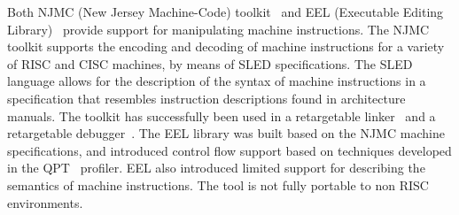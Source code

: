 Both NJMC (New Jersey Machine-Code) toolkit~\cite{Rams95,Rams97} and EEL
(Executable Editing Library)~\cite{Laru95} provide support for
manipulating machine instructions.  The NJMC toolkit supports the 
encoding and decoding of machine instructions for a variety of 
RISC and CISC machines, by means of SLED specifications.  
The SLED language allows for the description of the syntax of machine 
instructions in a specification that resembles instruction descriptions 
found in architecture manuals.
The toolkit has successfully been used in a retargetable 
linker~\cite{Fern95} and a retargetable debugger~\cite{Rams92}.  
The EEL library was built based on the NJMC machine specifications, 
and introduced control flow support based on techniques developed in 
the QPT~\cite{Laru94} profiler.  EEL also introduced limited
support for describing the semantics of machine instructions.
The tool is not fully portable to non RISC environments.


